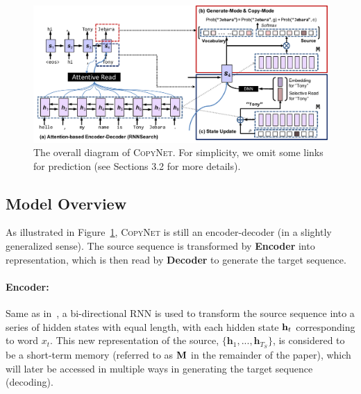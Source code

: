  \begin{figure}[htbp]
   	\centering
          	\includegraphics[width=1\linewidth]{figs/copynet/model-x.pdf} 
          	\caption{\label{model}The overall diagram of \textsc{CopyNet}. For simplicity, we omit some links for prediction (see Sections 3.2 for more details). }
          	\vspace{-7pt}
  \end{figure} 
  
\subsection{Model Overview}%
As illustrated in Figure~\ref{model}, \textsc{CopyNet} is still an encoder-decoder (in a slightly generalized sense). The source sequence is transformed by \textbf{Encoder} into 
representation, which is then read by \textbf{Decoder} to generate the target sequence.
\vspace{-5pt}
\paragraph{Encoder:} Same as in~\cite{bahdanau2014neural}, a bi-directional RNN is used to transform the source sequence into a series of hidden states with equal length, with each hidden state $\mathbf{h}_t$ corresponding to word $x_t$. 
This new representation of the source, $\{\mathbf{h}_1, ..., \mathbf{h}_{T_S}\}$, is considered to be a short-term memory  (referred to as $\mathbf{M}$ in the remainder of the paper), which will later be accessed in multiple ways in generating the target sequence (decoding).

